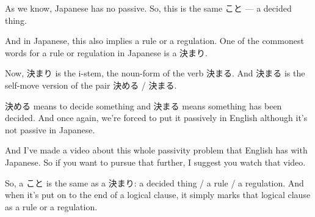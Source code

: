 As we know, Japanese has no passive. So, this is the same こと --- a decided thing.

And in Japanese, this also implies a rule or a regulation. One of the commonest words for a rule or regulation in Japanese is a 決まり.

Now, 決まり is the i-stem, the noun-form of the verb 決まる. And 決まる is the self-move version of the pair 決める / 決まる.

決める means to decide something and 決まる means something has been decided. And once again, we're forced to put it passively in English although it's not passive in Japanese.

And I've made a video about this whole passivity problem that English has with Japanese. So if you want to pursue that further, I suggest you watch that video.

So, a こと is the same as a 決まり: a decided thing / a rule / a regulation. And when it's put on to the end of a logical clause, it simply marks that logical clause as a rule or a regulation.

\stopsectionlevel

\stopsectionlevel
